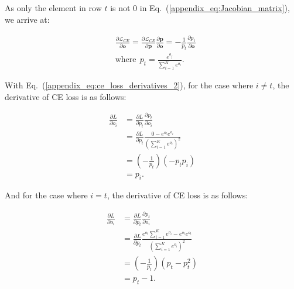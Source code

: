 \documentclass[letterpaper]{article} %
\newcommand{\Eref}[1]{Eq.~(\ref{#1})}
\begin{document}
As only the element in row $t$ is not $0$ in \Eref{appendix_eq:Jacobian_matrix}, we arrive at:
\begin{linenomath*}
\begin{equation}\label{appendix_eq:ce_loss_derivatives_2}
\begin{aligned}
    &\frac{\partial \mathcal{L}_{C E}}{\partial \boldsymbol{o}}=\frac{\partial \mathcal{L}_{C E}}{\partial \boldsymbol{p}} \frac{\partial \boldsymbol{p}}{\partial \boldsymbol{o}}=-\frac{1}{p_{t}} \frac{\partial p_{t}}{\partial \boldsymbol{o}}\\
    &\text{where}~~p_{t}=\frac{e^{o_{j}}}{\sum_{i=1}^{K} e^{o_{i}}}.
\end{aligned}
\end{equation}
\end{linenomath*}
With \Eref{appendix_eq:ce_loss_derivatives_2}, for the case where $i \neq t$, the derivative of CE loss is as follows:
\begin{linenomath*}
\begin{equation}\label{appendix_eq:ce_loss_derivatives_3}
\begin{aligned}
    \frac{\partial L}{\partial o_{i}} 
    &=\frac{\partial L}{\partial p_{t}}\frac{\partial p_{t}}{\partial o_{i}} \\
    &=\frac{\partial L}{\partial p_{t}} \frac{0-e^{o_{t}} e^{o_{i}}}{\left(\sum_{i=1}^{K} e^{o_{i}}\right)^{2}} \\
    &=(-\frac{1}{p_{t}})(-p_{t} p_{i}) \\
    &=p_{i}.
\end{aligned}
\end{equation}
\end{linenomath*}
And for the case where $i = t$, the derivative of CE loss is as follows:
\begin{linenomath*} 
\begin{equation}\label{appendix_eq:ce_loss_derivatives_4}
\begin{aligned}
    \frac{\partial L}{\partial o_{i}} &=\frac{\partial L}{\partial p_{t}}\frac{\partial p_{t}}{\partial o_{i}} \\
    &=\frac{\partial L}{\partial p_{t}}\frac{e^{o_{t}} \sum_{i=1}^{K} e^{o_{i}}-e^{o_{t}} e^{o_{t}}}{\left(\sum_{i=1}^{K} e^{o_{i}}\right)^{2}} \\
    &=(-\frac{1}{p_{t}})\left(p_{t}-p_{t}^{2}\right) \\
    &=p_{t}-1.
\end{aligned}
\end{equation}
\end{linenomath*}
\end{document}
